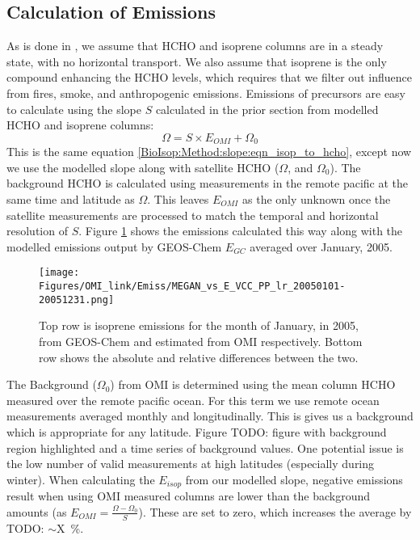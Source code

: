     
    
    
  \subsection{Calculation of Emissions}
    \label{BioIsop:Calculation}
   
    As is done in \textcite{Palmer2003, Millet2006, Bauwens2016}, we assume that HCHO and isoprene columns are in a steady state, with no horizontal transport.
    We also assume that isoprene is the only compound enhancing the HCHO levels, which requires that we filter out influence from fires, smoke, and anthropogenic emissions.
    Emissions of precursors are easy to calculate using the slope $S$ calculated in the prior section from modelled HCHO and isoprene columns:
    \begin{equation*}
    \Omega = S \times E_{OMI} + \Omega_0
    \end{equation*}
    This is the same equation \ref{BioIsop:Method:slope:eqn_isop_to_hcho}, except now we use the modelled slope along with satellite HCHO ($\Omega$, and $\Omega_0$).
    The background HCHO is calculated using measurements in the remote pacific at the same time and latitude as $\Omega$.
    This leaves $E_{OMI}$ as the only unknown once the satellite measurements are processed to match the temporal and horizontal resolution of $S$.
    Figure \ref{BioIsop:Calculation:fig_E_isop_200501} shows the emissions calculated this way along with the modelled emissions output by GEOS-Chem $E_{GC}$ averaged over January, 2005.
    \begin{figure}
      \texttt{[image: Figures/OMI\_link/Emiss/MEGAN\_vs\_E\_VCC\_PP\_lr\_20050101-20051231.png]}
      \caption{%
        Top row is isoprene emissions for the month of January, in 2005, from GEOS-Chem and estimated from OMI respectively.
        Bottom row shows the absolute and relative differences between the two.
      }
      \label{BioIsop:Calculation:fig_E_isop_200501}
    \end{figure}
    
    The Background ($\Omega_0$) from OMI is determined using the mean column HCHO measured over the remote pacific ocean.
    For this term we use remote ocean measurements averaged monthly and longitudinally.
    This is gives us a background which is appropriate for any latitude.
    Figure TODO: figure with background region highlighted and a time series of background values.
    One potential issue is the low number of valid measurements at high latitudes (especially during winter).
    When calculating the $E_{isop}$ from our modelled slope, negative emissions result when using OMI measured columns are lower than the background amounts (as $E_{OMI} = \frac{\Omega - \Omega_0}{S}$).
    These are set to zero, which increases the average by TODO: $\sim$X~\%.
    

